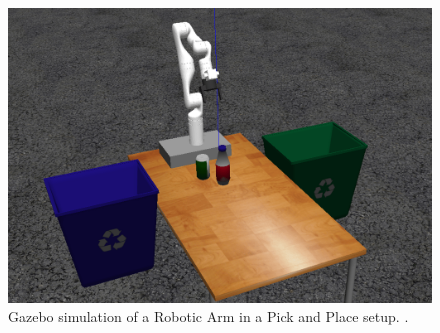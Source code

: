 \documentclass[12pt,oneside]{article}
\begin{document}
\begin{figure}[H]
\centering
\includegraphics[width=0.9\linewidth]{gazebo_robotic_arm}
\caption{Gazebo simulation of a Robotic Arm in a Pick and Place setup. \cite{mathworks2021}.}
\label{fig:gazeboroboticarm}
\end{figure}
\end{document}
